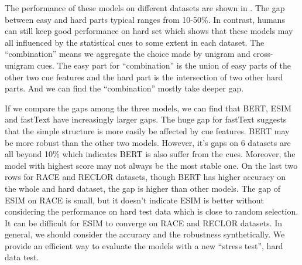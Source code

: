 The performance of these models on different datasets are shown in . 
The gap between easy and hard parts typical ranges from 10-50\%. 
In contrast, humans can still keep good performance on hard set which shows that 
these models may all influenced by the statistical cues to some extent in each dataset. 
The ``combination'' means we aggregate the choice made by unigram and cross-unigram cues.
The easy part for ``combination'' is the union of easy parts of the other two cue features and 
the hard part is the intersection of two other hard parts. And we can find the ``combination'' mostly take deeper 
gap.

If we compare the gaps among the three models, 
we can find that BERT, ESIM and fastText have increasingly larger gaps.
The huge gap for fastText 
suggests that the simple 
structure is more easily be affected by cue features.
BERT may be more robust than the other two models. However, it's gaps on 6 datasets 
are all beyond 10\% which indicates BERT is also suffer from the cues. Moreover, the model with 
highest score may not always be the most stable one. On the last two rows for RACE and RECLOR 
datasets, though BERT has higher accuracy on the whole and hard dataset, 
the gap is higher than other models. The gap of ESIM on RACE is small, but it doesn't  
indicate ESIM is better without considering the performance on hard test data which 
is close to random selection. 
It can be difficult for ESIM to converge on RACE and RECLOR
datasets. 
In general, we should consider the accuracy and the robustness 
synthetically. We provide an efficient way to evaluate the models with a new ``stress test'', hard data test. 

